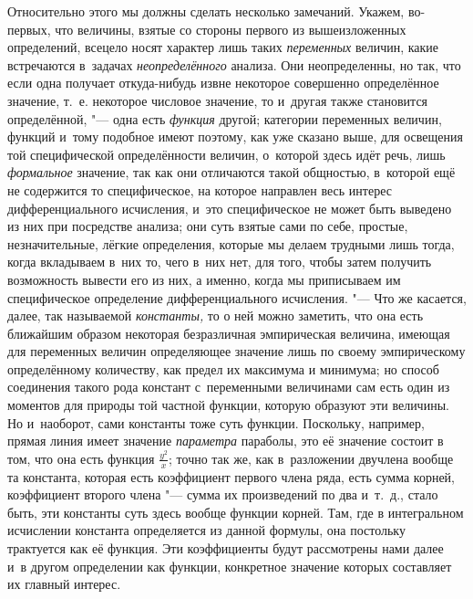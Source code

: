 Относительно этого мы должны сделать несколько замечаний. Укажем, во-первых,
что величины, взятые со стороны первого из вышеизложенных определений, всецело
носят характер лишь таких {\em переменных} величин, какие встречаются в~задачах
{\em неопределённого} анализа. Они неопределенны, но так, что если одна
получает откуда-нибудь извне некоторое совершенно определённое значение, т.~е.
некоторое числовое значение, то и~другая также становится определённой, "---
одна есть {\em функция} другой; категории переменных величин, функций и~тому
подобное имеют поэтому, как уже сказано выше, для освещения той специфической
определённости величин, о~которой здесь идёт речь, лишь {\em формальное}
значение, так как они отличаются такой общностью, в~которой ещё не содержится
то специфическое, на которое направлен весь интерес дифференциального
исчисления, и~это специфическое не может быть выведено из них при посредстве
анализа; они суть взятые сами по себе, простые, незначительные, лёгкие
определения, которые мы делаем трудными лишь тогда, когда вкладываем в~них то,
чего в~них нет, для того, чтобы затем получить возможность вывести его из них,
а именно, когда мы приписываем им специфическое определение дифференциального
исчисления. "--- Что же касается, далее, так называемой {\em константы,} то о
ней можно заметить, что она есть ближайшим образом некоторая безразличная
эмпирическая величина, имеющая для переменных величин определяющее значение
лишь по своему эмпирическому определённому количеству, как предел их максимума
и минимума; но способ соединения такого рода констант с~переменными величинами
сам есть один из моментов для природы той частной функции, которую образуют эти
величины. Но и~наоборот, сами константы тоже суть функции. Поскольку, например,
прямая линия имеет значение {\em параметра} параболы, это её значение состоит в
том, что она есть функция $\frac{y^2}x$; точно так же, как в~разложении
двучлена вообще та константа, которая есть коэффициент первого члена ряда, есть
сумма корней, коэффициент второго члена "--- сумма их произведений по два
и~т.~д., стало быть, эти константы суть здесь вообще функции корней. Там, где в
интегральном исчислении константа определяется из данной формулы, она постольку
трактуется как её функция. Эти коэффициенты будут рассмотрены нами далее и~в
другом определении как функции, конкретное значение которых составляет их
главный интерес.

